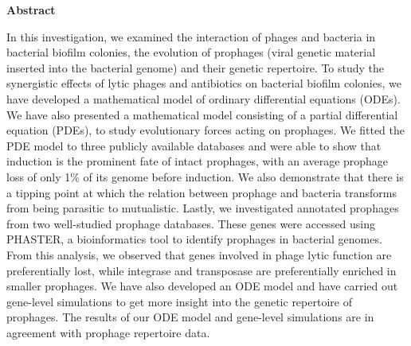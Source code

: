 \documentclass[12pt,twoside]{report}
\makeatletter
\numberwithin{figure}{chapter}
\newenvironment{preliminary}%
{\pagestyle{plain}\pagenumbering{roman}}%
{\pagenumbering{arabic}}
\newcommand\isco[1]{%
  \edef\@tempa{#1}%
  \def\@tempb{}%
  \ifx\@tempa\@tempb
	\else \\\underline{Co-Supervisor:}\vspace{0.35in}\\\dots\dots\dots\dots\dots\dots\dots\\{#1}\\
  \fi
}
\newcommand\isjoint[1]{%
  \edef\@tempa{#1}%
  \def\@tempb{}%
  \ifx\@tempa\@tempb
	\else \\\underline{Joint Supervisor:}\vspace{0.35in}\\\dots\dots\dots\dots\dots\dots\dots\\{#1}\\
  \fi
}
\newcommand\isalt[1]{%
  \edef\@tempa{#1}%
  \def\@tempb{}%
  \ifx\@tempa\@tempb
	\else \\\underline{Alternate Supervisor:}\vspace{0.35in}\\\dots\dots\dots\dots\dots\dots\dots\\{#1}\\
  \fi
}
\newcommand\isdefinedsig[1]{%
  \edef\@tempa{#1}%
  \def\@tempb{}%
  \ifx\@tempa\@tempb
	\else \\ \dots\dots\dots\dots\dots\dots\dots\\{#1}\\
  \fi
}
\newcommand\isdefinedspinetitle[1]{%
  \edef\@tempa{#1}%
  \def\@tempb{}%
  \ifx\@tempa\@tempb
	\else (Spine title: #1)\\
  \fi
}
\newcommand\coauthor[1]{%
  \edef\@tempa{#1}%
  \def\@tempb{}%
  \ifx\@tempa\@tempb
	\else \newpage \Large Co-Authorship Statement\normalsize\\\indent\\#1\\
  \fi
}
\newcommand\acknowlege[1]{%
  \edef\@tempa{#1}%
  \def\@tempb{}%
  \ifx\@tempa\@tempb
	\else \newpage \Large Acknowlegements\normalsize\\\indent\\#1\newpage
  \fi
}
\newcommand{\super}{Dr. Lindi M. Wahl} %
\newcommand{\superc}{} %
\newcommand{\supera}{} %
\newcommand{\sco}{Dr. W. J. Braun}  %
\newcommand{\sct}{Dr. A. Bing}  %
\newcommand{\examo}{Dr. Q. Ring}  %
\newcommand{\examt}{Dr. W. Fing}
\newcommand{\examth}{Dr. G. Hing}
\newcommand{\examf}{}
\newcommand{\department}{Applied Mathematics}
\newcommand{\degree}{Doctor of Philosophy}
\newcommand{\firstname}{Amjad}
\newcommand{\middlename}{}
\newcommand{\lastname}{Khan}
\newcommand{\authorname}{{\firstname} {\middlename} {\lastname}}
\newcommand{\titl}{Phage-bacteria interaction and the evolution of prophage sequences}
\newcommand{\spinetitle}{}%
\newcommand{\thesisformat}{Integrated Article} %
\newcommand{\gyear}{\number\year}
\newcommand{\makecoauthor}{
I, Amjad Khan, declare that this thesis titled, “Phage-bacteria interaction and prophage sequences in bacterial genomes” has been written by me under the supervision of  Dr.  Lindi M. Wahl. 

\textbf{Chapter 2}: Phage therapy and antibiotics for biofilm eradication: a predictive model, has been published as a book chapter co-authored with L.M. Wahl and P. Yu in Recent Advances in Mathematical and Statistical Methods. AK developed the model with supervisory input from LMW, and AK performed the analysis. PY confirmed the analysis. AK drafted the paper. AK, PY and LMW finalized the paper.

\textbf{Chapter 3}: Quantifying the forces that maintain prophages in bacterial genomes, has been accepted as journal article co-authored with L.M. Wahl in Journal of Theoretical Population Biology. AK and LMW developed the model. AK and LMW contributed equally to the bioinformatics analysis. AK wrote the code, executed and analyzed all optimization results. AK drafted all results. AK and LMW jointly wrote the paper.

\textbf{Chapter 4}: The genetic repertoire of prophages, has been submitted for publication co-authored with L.M. Wahl and A.R. Burmeister in PLOS Computational Biology. AK, ARB and LMW designed the study. AK and LMW developed the mathematical and computational approaches. AK, ARB and LMW analysed the data. AK, ARB and LMW wrote the manuscript.
}
\newcommand{\makeacknowlege} {
I am thankful to my supervisor Lindi Wahl for continued support and insights. My supervisor's guidance helped me in all the time of research and writing of this thesis. I could not have imagined having a better supervisor and mentor for my Ph.D study. I am also indebted to Professor Pei Yu (Department of Applied Mathematics, UWO) and  Alita Burmeister (Associate Research Scientist in Ecology and Evolutionary Biology, Yale University) for several insightful comments.  Lastly, I would like to thank the professors and staff in the Department of Applied Mathematics, Western University, for their help during my graduate studies.
}
\renewcommand{\maketitle}
{\begin{titlepage}
   \setcounter{page}{1}
   \begin{large}
   \begin{center}
      \mbox{}
      \vfill
      {\MakeUppercase{\titl}}\\
      \isdefinedspinetitle{\spinetitle}
      (Thesis format: \thesisformat)\\
      \vfill
      by \\
      \vfill
      {\firstname} \underline{\lastname}\\
      \vfill
      Graduate Program in {\department}\\
      \vfill
		A thesis submitted in partial fulfillment\\
		of the requirements for the degree of\\
		\degree\\
		\vfill
		The School of Graduate and Postdoctoral Studies\\
		The University of Western Ontario\\
		London, Ontario, Canada\\
		\vfill
      {\copyright} {\authorname} {\gyear}  \\
      \vspace*{.2in}
   \end{center}
   \end{large}
   \end{titlepage}

}%
\newcommand{\makecert}{
   \setcounter{page}{2}
\vfill
\begin{center}
\large
THE UNIVERSITY OF WESTERN ONTARIO\\
School of Graduate and Postdoctoral Studies\\
\vfill
\textbf{CERTIFICATE OF EXAMINATION}
\end{center}

\vfill
\begin{table}[ht]
\begin{minipage}[t]{0.5\linewidth} %
\begin{tabular}{l}
\underline{Supervisor:}\vspace{0.35in}
\isdefinedsig{\super}
\isco{\superc}
\isjoint{\superj}
\isalt{\supera}
\\
\underline{Supervisory Committee:}\vspace{0.35in}
\isdefinedsig{\sco}\vspace{0.15in}
\isdefinedsig{\sct}
\end{tabular}
\vfill
\end{minipage}
\hspace{0.5in}
\begin{minipage}[t]{0.5\linewidth}
\begin{tabular}{l}
\underline{Examiners:} \\\vspace{.5cm}
\isdefinedsig{\examo}\\
\isdefinedsig{\examt}\\
\isdefinedsig{\examth}\\
\isdefinedsig{\examf}
\end{tabular}
\vfill
\end{minipage}
\vfill
\end{table}
\vfill
\begin{center}
The thesis by \\ \vfill
\textbf{\firstname{} \middlename{} \underline{\lastname}}\\
\vfill
entitled:\\\vfill
\textbf{\titl}\\\vfill
is accepted in partial fulfillment of the \\
requirements for the degree of\\
\degree\\
\end{center}
\begin{table}[ht]
\begin{minipage}[t]{0.5\linewidth}
\begin{tabular}{l}
\dots\dots\dots\dots\dots\\
Date
\end{tabular}
\end{minipage}
\hspace{0.5in}
\begin{minipage}[t]{0.5\linewidth}
\begin{tabular}{l}
\dots\dots\dots\dots\dots\dots\dots\dots\dots\dots\\
Chair of the Thesis Examination Board
\end{tabular}
\end{minipage}
\end{table}

}
\makeatother
\begin{document}


\begin{preliminary}

\Large\begin{center}\textbf{Abstract}\end{center}\normalsize

In this investigation, we examined the interaction of phages and bacteria in bacterial biofilm colonies,  the evolution of prophages (viral genetic material inserted into the bacterial genome) and their genetic repertoire. To study the synergistic effects of lytic phages and antibiotics on bacterial biofilm colonies, we have developed a mathematical model of ordinary differential equations (ODEs).  We have also presented a mathematical model consisting of a partial differential equation (PDEs), to study evolutionary forces acting on prophages.  We fitted the PDE model to three publicly available databases and were able to show that induction is the prominent fate of intact prophages, with an average prophage loss of only 1\% of its genome before induction.  We also demonstrate that there is a tipping point at which the relation between prophage and bacteria transforms from being parasitic to mutualistic. Lastly, we investigated annotated prophages from two well-studied prophage databases. These genes were accessed using PHASTER, a bioinformatics tool to identify prophages in bacterial genomes. From this analysis, we observed that genes involved in phage lytic function are preferentially lost, while integrase and transposase are preferentially enriched in smaller prophages.  We have also developed an ODE model and have carried out gene-level simulations to get more insight into the genetic repertoire of prophages.
The results of our ODE model and gene-level simulations are in agreement with prophage repertoire data.   


\end{preliminary}
\end{document}
